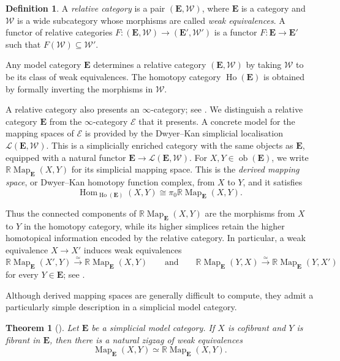 \documentclass{amsart}
\newcommand{\bE}{\mathbf{E}}
\newcommand{\Hom}{\operatorname{Hom}}
\newcommand{\Ho}{\operatorname{Ho}}
\newcommand{\ob}{\operatorname{ob}}
\newcommand{\Map}{\operatorname{Map}}
\newtheorem{thm}[theorem]{Theorem}%
\theoremstyle{definition}
\newtheorem{definition}[theorem]{Definition}%
\numberwithin{equation}{section}
\begin{document}
\begin{definition}\label{def: relative category} A \emph{relative category} is a pair $(\bE,\mathscr W)$, where $\bE$ is a category and $\mathscr W$ is a wide subcategory whose morphisms are called \emph{weak equivalences}. A functor of relative categories $F\colon(\bE,\mathscr W)\to(\bE',\mathscr W')$ is a functor $F\colon\bE\to\bE'$ such that $F(\mathscr W)\subseteq\mathscr W'$.
\end{definition}

Any model category $\bE$ determines a relative category $(\bE,\mathscr W)$ by taking $\mathscr W$ to be its class of weak equivalences. The homotopy category $\Ho(\bE)$ is obtained by formally inverting the morphisms in $\mathscr W$.


A relative category also presents an $\infty$-category; see \cite{barwick_kan}. We distinguish a relative category $\bE$ from the $\infty$-category $\mathcal E$ that it presents. A concrete model for the mapping spaces of $\mathcal E$ is provided by the Dwyer--Kan simplicial localisation $\mathcal L(\bE,\mathscr W)$. This is a simplicially enriched category with the same objects as $\bE$, equipped with a natural functor $\bE\to\mathcal L(\bE,\mathscr W)$. For $X,Y\in\ob(\bE)$, we write $\mathbb R\Map_{\bE}(X,Y)$ for its simplicial mapping space. This is the \emph{derived mapping space}, or Dwyer--Kan homotopy function complex, from $X$ to $Y$, and it satisfies
\[
\Hom_{\Ho(\bE)}(X,Y) \cong \pi_0\mathbb R\Map_{\bE}(X,Y).
\]


Thus the connected components of $\mathbb R\Map_{\bE}(X,Y)$ are the morphisms from $X$ to $Y$ in the homotopy category, while its higher simplices retain the higher homotopical information encoded by the relative category. In particular, a weak equivalence $X\to X'$ induces weak equivalences
\[
\mathbb R\Map_{\bE}(X',Y)
\xrightarrow{\simeq}
\mathbb R\Map_{\bE}(X,Y)
\qquad \text{and} \qquad
\mathbb R\Map_{\bE}(Y,X)
\xrightarrow{\simeq}
\mathbb R\Map_{\bE}(Y,X')
\]
for every $Y\in\bE$; see \cite{DWYER1980267}.

Although derived mapping spaces are generally difficult to compute, they admit a particularly simple description in a simplicial model
category.

\begin{thm}[{\cite[Corollary~4.7]{dk}}]
\label{thm: identifying mapping spaces in a simplicial model category} Let $\bE$ be a simplicial model category. If $X$ is cofibrant and $Y$ is fibrant in $\bE$, then there is a natural zigzag of weak equivalences
\[
\Map_{\bE}(X,Y) \simeq \mathbb R\Map_{\bE}(X,Y).
\]
\end{thm}
\end{document}
